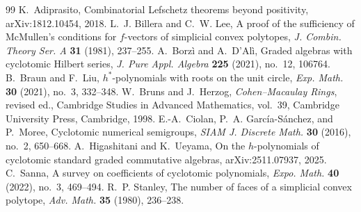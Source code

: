 \documentclass[11pt,a4paper]{amsart}
\theoremstyle{definition}
\theoremstyle{remark}
\begin{document}
\bigskip
\begin{thebibliography}{99}
 K.~Adiprasito, Combinatorial Lefschetz theorems beyond positivity, arXiv:1812.10454, 2018.
 L.~J. Billera and C.~W. Lee, A proof of the sufficiency of McMullen's conditions for $f$-vectors of simplicial convex polytopes, \textit{J. Combin. Theory Ser. A} \textbf{31} (1981), 237--255.
 A.~Borz\`i and A.~D'Al\`i, Graded algebras with cyclotomic Hilbert series, \textit{J. Pure Appl. Algebra} \textbf{225} (2021), no.~12, 106764.
 B.~Braun and F.~Liu, $h^*$-polynomials with roots on the unit circle, \textit{Exp. Math.} \textbf{30} (2021), no.~3, 332--348.
 W.~Bruns and J.~Herzog, \textit{Cohen--Macaulay Rings}, revised ed., Cambridge Studies in Advanced Mathematics, vol.~39, Cambridge University Press, Cambridge, 1998.
 E.-A.~Ciolan, P.~A. Garc\'ia-S\'anchez, and P.~Moree, Cyclotomic numerical semigroups, \textit{SIAM J. Discrete Math.} \textbf{30} (2016), no.~2, 650--668.
 A.~Higashitani and K.~Ueyama, On the $h$-polynomials of cyclotomic standard graded commutative algebras, arXiv:2511.07937, 2025.
 C.~Sanna, A survey on coefficients of cyclotomic polynomials, \textit{Expo. Math.} \textbf{40} (2022), no.~3, 469--494.
 R.~P. Stanley, The number of faces of a simplicial convex polytope, \textit{Adv. Math.} \textbf{35} (1980), 236--238.
\end{thebibliography}
\end{document}
